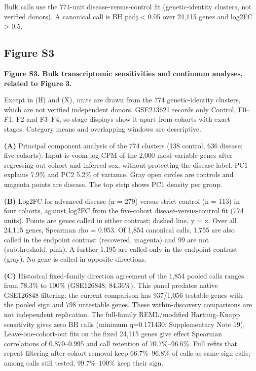 Bulk calls use the 774-unit disease-versus-control fit (genetic-identity clusters, not verified donors). A canonical call is BH padj \textless{} 0.05 over 24,115 genes and \textbar log2FC\textbar{} \textgreater{} 0.5.


\subsection{Figure S3}\label{figure-s3}

\textbf{Figure S3. Bulk transcriptomic sensitivities and continuum analyses, related to Figure 3.}

Except in (H) and (X), units are drawn from the 774 genetic-identity clusters, which are not verified independent donors. GSE213621 records only Control, F0--F1, F2 and F3--F4, so stage displays show it apart from cohorts with exact stages. Category means and overlapping windows are descriptive.

\textbf{(A)} Principal component analysis of the 774 clusters (138 control, 636 disease; five cohorts). Input is voom log-CPM of the 2,000 most variable genes after regressing out cohort and inferred sex, without protecting the disease label. PC1 explains 7.9\% and PC2 5.2\% of variance. Gray open circles are controls and magenta points are disease. The top strip shows PC1 density per group.

\textbf{(B)} Log2FC for advanced disease (n = 279) versus strict control (n = 113) in four cohorts, against log2FC from the five-cohort disease-versus-control fit (774 units). Points are genes called in either contrast; dashed line, y = x. Over all 24,115 genes, Spearman rho = 0.953. Of 1,854 canonical calls, 1,755 are also called in the endpoint contrast (recovered, magenta) and 99 are not (subthreshold, pink). A further 1,195 are called only in the endpoint contrast (gray). No gene is called in opposite directions.

\textbf{(C)} Historical fixed-family direction agreement of the 1,854 pooled calls ranges from 78.3\% to 100\% (GSE126848, 84.36\%). This panel predates native GSE126848 filtering: the current comparison has 937/1,056 testable genes with the pooled sign and 798 untestable genes. These within-discovery comparisons are not independent replication. The full-family REML/modified Hartung--Knapp sensitivity gives zero BH calls (minimum q=0.171430; Supplementary Note 19). Leave-one-cohort-out fits on the fixed 24,115 genes give effect Spearman correlations of 0.870--0.995 and call retention of 70.7\%--96.6\%. Full refits that repeat filtering after cohort removal keep 66.7\%--96.8\% of calls as same-sign calls; among calls still tested, 99.7\%--100\% keep their sign.

